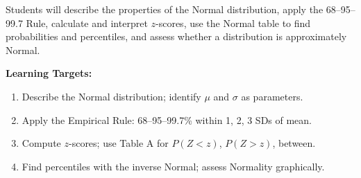 \documentclass[aspectratio=169, 11pt]{beamer}
\begin{document}
{
\begin{frame}[t, plain]
  \vspace{0.45cm}\par
  \hspace{0.55cm}%
  \begin{minipage}{0.9\textwidth}


    \normalsize
    Students will describe the properties of the Normal distribution,
    apply the 68--95--99.7 Rule, calculate and interpret $z$-scores,
    use the Normal table to find probabilities and percentiles, and
    assess whether a distribution is approximately Normal.

    \vspace{0.5cm}
    \textbf{Learning Targets:}
    \begin{enumerate}\small
      \setlength{\itemsep}{0.4em}
      \item Describe the Normal distribution; identify $\mu$ and $\sigma$ as parameters.
      \item Apply the Empirical Rule: 68--95--99.7\% within 1, 2, 3 SDs of mean.
      \item Compute $z$-scores; use Table A for $P(Z<z)$, $P(Z>z)$, between.
      \item Find percentiles with the inverse Normal; assess Normality graphically.
    \end{enumerate}
  \end{minipage}
\end{frame}
}
\end{document}
